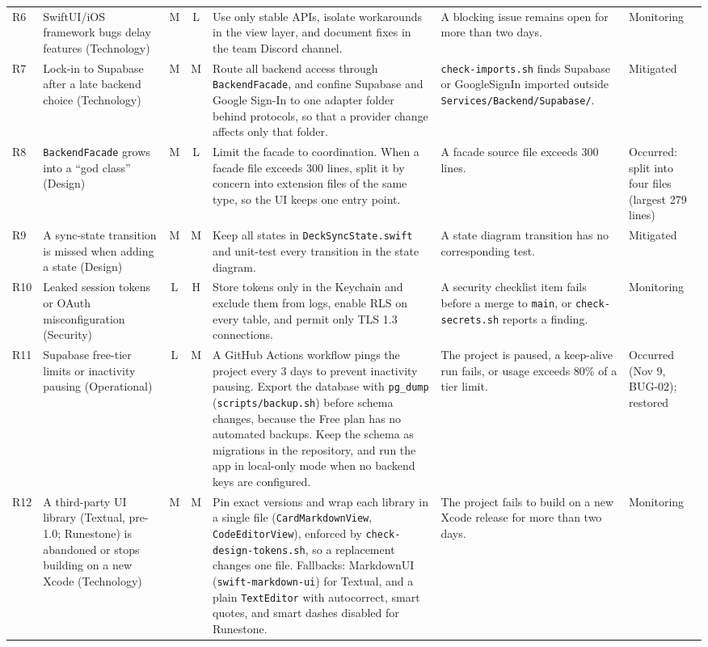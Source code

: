 \documentclass[12pt,letterpaper]{article}
\begin{document}
\begin{xltabular}{\textwidth}{@{}l L{3.0cm} c c Y L{2.9cm} L{1.7cm}@{}}
R6 & SwiftUI/iOS framework bugs delay features (Technology) & M & L & Use only stable APIs, isolate workarounds in the view layer, and document fixes in the team Discord channel. & A blocking issue remains open for more than two days. & Monitoring \\
R7 & Lock-in to Supabase after a late backend choice (Technology) & M & M & Route all backend access through \texttt{BackendFacade}, and confine Supabase and Google Sign-In to one adapter folder behind protocols, so that a provider change affects only that folder. & \texttt{check-imports.sh} finds Supabase or GoogleSignIn imported outside \texttt{Services/\allowbreak Backend/\allowbreak Supabase/}. & Mitigated \\
R8 & \texttt{BackendFacade} grows into a ``god class'' (Design) & M & L & Limit the facade to coordination. When a facade file exceeds 300 lines, split it by concern into extension files of the same type, so the UI keeps one entry point. & A facade source file exceeds 300 lines. & Occurred: split into four files (largest 279 lines) \\
R9 & A sync-state transition is missed when adding a state (Design) & M & M & Keep all states in \texttt{DeckSyncState.swift} and unit-test every transition in the state diagram. & A state diagram transition has no corresponding test. & Mitigated \\
R10 & Leaked session tokens or OAuth misconfiguration (Security) & L & H & Store tokens only in the Keychain and exclude them from logs, enable RLS on every table, and permit only TLS 1.3 connections. & A security checklist item fails before a merge to \texttt{main}, or \texttt{check-secrets.sh} reports a finding. & Monitoring \\
R11 & Supabase free-tier limits or inactivity pausing (Operational) & L & M & A GitHub Actions workflow pings the project every 3 days to prevent inactivity pausing. Export the database with \texttt{pg\_dump} (\texttt{scripts/backup.sh}) before schema changes, because the Free plan has no automated backups. Keep the schema as migrations in the repository, and run the app in local-only mode when no backend keys are configured. & The project is paused, a keep-alive run fails, or usage exceeds 80\% of a tier limit. & Occurred (Nov 9, BUG-02); restored \\
R12 & A third-party UI library (Textual, pre-1.0; Runestone) is abandoned or stops building on a new Xcode (Technology) & M & M & Pin exact versions and wrap each library in a single file (\texttt{CardMarkdownView}, \texttt{CodeEditorView}), enforced by \texttt{check-design-tokens.sh}, so a replacement changes one file. Fallbacks: MarkdownUI (\texttt{swift-markdown-ui}) for Textual, and a plain \texttt{TextEditor} with autocorrect, smart quotes, and smart dashes disabled for Runestone. & The project fails to build on a new Xcode release for more than two days. & Monitoring \\

\end{xltabular}
\end{document}
